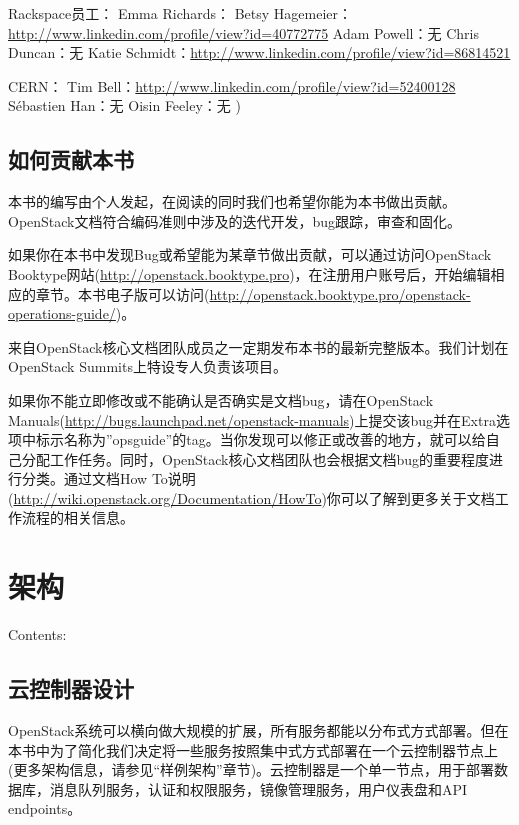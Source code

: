 \documentclass[letterpaper,10pt,english]{sphinxmanual}
\begin{document}
Rackspace员工： Emma Richards： Betsy Hagemeier：\href{http://www.linkedin.com/profile/view?id=40772775}{http://www.linkedin.com/profile/view?id=40772775} Adam Powell：无 Chris Duncan：无 Katie Schmidt：\href{http://www.linkedin.com/profile/view?id=86814521}{http://www.linkedin.com/profile/view?id=86814521}

CERN： Tim Bell：\href{http://www.linkedin.com/profile/view?id=52400128}{http://www.linkedin.com/profile/view?id=52400128} Sébastien Han：无 Oisin Feeley：无 )


\section{如何贡献本书}
\label{Introduction/How to Work on This Book::doc}\label{Introduction/How to Work on This Book:id1}
本书的编写由个人发起，在阅读的同时我们也希望你能为本书做出贡献。OpenStack文档符合编码准则中涉及的迭代开发，bug跟踪，审查和固化。

如果你在本书中发现Bug或希望能为某章节做出贡献，可以通过访问OpenStack Booktype网站(\href{http://openstack.booktype.pro}{http://openstack.booktype.pro})，在注册用户账号后，开始编辑相应的章节。本书电子版可以访问(\href{http://openstack.booktype.pro/openstack-operations-guide/}{http://openstack.booktype.pro/openstack-operations-guide/})。

来自OpenStack核心文档团队成员之一定期发布本书的最新完整版本。我们计划在OpenStack Summits上特设专人负责该项目。

如果你不能立即修改或不能确认是否确实是文档bug，请在OpenStack Manuals(\href{http://bugs.launchpad.net/openstack-manuals}{http://bugs.launchpad.net/openstack-manuals})上提交该bug并在Extra选项中标示名称为''opsguide''的tag。当你发现可以修正或改善的地方，就可以给自己分配工作任务。同时，OpenStack核心文档团队也会根据文档bug的重要程度进行分类。通过文档How To说明(\href{http://wiki.openstack.org/Documentation/HowTo}{http://wiki.openstack.org/Documentation/HowTo})你可以了解到更多关于文档工作流程的相关信息。


\chapter{架构}
\label{Architecture/index::doc}\label{Architecture/index:id1}
Contents:


\section{云控制器设计}
\label{Architecture/Cloud Controller Design::doc}\label{Architecture/Cloud Controller Design:id1}
OpenStack系统可以横向做大规模的扩展，所有服务都能以分布式方式部署。但在本书中为了简化我们决定将一些服务按照集中式方式部署在一个云控制器节点上(更多架构信息，请参见“样例架构”章节)。云控制器是一个单一节点，用于部署数据库，消息队列服务，认证和权限服务，镜像管理服务，用户仪表盘和API endpoints。
\end{document}
